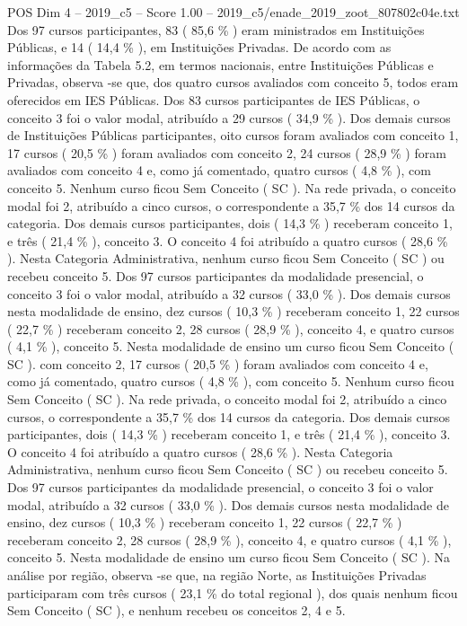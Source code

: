 \begin{textsample}{POS Dim 4 – 2019\_c5 – Score 1.00 – 2019\_c5/enade\_2019\_zoot\_807802c04e.txt}
Dos 97 cursos participantes, 83 ( 85,6 \% ) eram ministrados em Instituições Públicas, e 14 ( 14,4 \% ), em Instituições Privadas.
De acordo com as informações da Tabela 5.2, em termos nacionais, entre Instituições Públicas e Privadas, observa -se que, dos quatro cursos avaliados com conceito 5, todos eram oferecidos em IES Públicas.
Dos 83 cursos participantes de IES Públicas, o conceito 3 foi o valor modal, atribuído a 29 cursos ( 34,9 \% ).
Dos demais cursos de Instituições Públicas participantes, oito cursos foram avaliados com conceito 1, 17 cursos ( 20,5 \% ) foram avaliados com conceito 2, 24 cursos ( 28,9 \% ) foram avaliados com conceito 4 e, como já comentado, quatro cursos ( 4,8 \% ), com conceito 5.
Nenhum curso ficou Sem Conceito ( SC ).
Na rede privada, o conceito modal foi 2, atribuído a cinco cursos, o correspondente a 35,7 \% dos 14 cursos da categoria.
Dos demais cursos participantes, dois ( 14,3 \% ) receberam conceito 1, e três ( 21,4 \% ), conceito 3.
O conceito 4 foi atribuído a quatro cursos ( 28,6 \% ).
Nesta Categoria Administrativa, nenhum curso ficou Sem Conceito ( SC ) ou recebeu conceito 5.
Dos 97 cursos participantes da modalidade presencial, o conceito 3 foi o valor modal, atribuído a 32 cursos ( 33,0 \% ).
Dos demais cursos nesta modalidade de ensino, dez cursos ( 10,3 \% ) receberam conceito 1, 22 cursos ( 22,7 \% ) receberam conceito 2, 28 cursos ( 28,9 \% ), conceito 4, e quatro cursos ( 4,1 \% ), conceito 5.
Nesta modalidade de ensino um curso ficou Sem Conceito ( SC ). com conceito 2, 17 cursos ( 20,5 \% ) foram avaliados com conceito 4 e, como já comentado, quatro cursos ( 4,8 \% ), com conceito 5.
Nenhum curso ficou Sem Conceito ( SC ).
Na rede privada, o conceito modal foi 2, atribuído a cinco cursos, o correspondente a 35,7 \% dos 14 cursos da categoria.
Dos demais cursos participantes, dois ( 14,3 \% ) receberam conceito 1, e três ( 21,4 \% ), conceito 3.
O conceito 4 foi atribuído a quatro cursos ( 28,6 \% ).
Nesta Categoria Administrativa, nenhum curso ficou Sem Conceito ( SC ) ou recebeu conceito 5.
Dos 97 cursos participantes da modalidade presencial, o conceito 3 foi o valor modal, atribuído a 32 cursos ( 33,0 \% ).
Dos demais cursos nesta modalidade de ensino, dez cursos ( 10,3 \% ) receberam conceito 1, 22 cursos ( 22,7 \% ) receberam conceito 2, 28 cursos ( 28,9 \% ), conceito 4, e quatro cursos ( 4,1 \% ), conceito 5.
Nesta modalidade de ensino um curso ficou Sem Conceito ( SC ).
Na análise por região, observa -se que, na região Norte, as Instituições Privadas participaram com três cursos ( 23,1 \% do total regional ), dos quais nenhum ficou Sem Conceito ( SC ), e nenhum recebeu os conceitos 2, 4 e 5.

\end{textsample}
